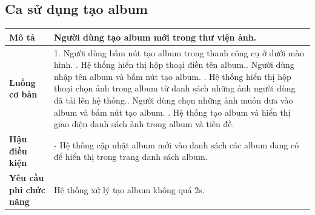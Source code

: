 \subsection{Ca sử dụng tạo album}

\vspace{0.5cm}

\noindent 
\begin{tabularx}{\linewidth}{| l | X |} 
\hline 
\textbf{Mô tả} & Người dùng tạo album mới trong thư viện ảnh. \\
\hline 
\textbf{Luồng cơ bản} & 1. Người dùng bấm nút tạo album trong thanh công cụ ở dưới màn hình. \newline
                       2. Hệ thống hiển thị hộp thoại điền tên album.\newline
                       3. Người dùng nhập tên album và bấm nút tạo album. \newline
                       4. Hệ thống hiển thị hộp thoại chọn ảnh trong album từ danh sách những ảnh người dùng đã tải lên hệ thống.\newline
                       5. Người dùng chọn những ảnh muốn đưa vào album và bấm nút tạo album. \newline
                       6. Hệ thống tạo album và hiển thị giao diện danh sách ảnh trong album và tiêu đề. \\
\hline 
\textbf{Hậu điều kiện} & - Hệ thống cập nhật album mới vào danh sách các album đang có để hiển thị trong trang danh sách album. \\
\hline 
\textbf{Yêu cầu phi chức năng} & Hệ thống xử lý tạo album không quá 2s. \\
\hline 
\end{tabularx}

\vspace{0.8cm}


